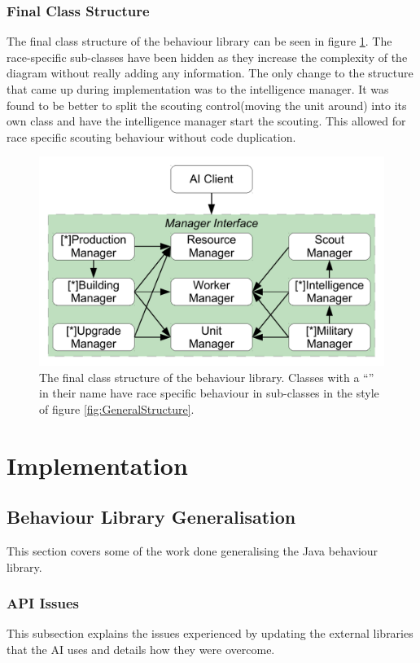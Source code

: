 \documentclass[11pt,openright,a4paper]{report}
\begin{document}
\subsection{Final Class Structure}
The final class structure of the behaviour library can be seen in figure \ref{fig:ClassDia}. The race-specific sub-classes have been hidden as they increase the complexity of the diagram without really adding any information. The only change to the structure that came up during implementation was to the intelligence manager. It was found to be better to split the scouting control(moving the unit around) into its own class and have the intelligence manager start the scouting. This allowed for race specific scouting behaviour without code duplication.
\begin{figure}[h]
    \centering
    \includegraphics[scale=0.5]{ClassDia}
    \caption{The final class structure of the behaviour library. Classes with a ``\lbrack*\rbrack'' in their name have race specific behaviour in sub-classes in the style of figure \ref{fig:GeneralStructure}.}
    \label{fig:ClassDia}
\end{figure}

\chapter{Implementation}
\label{Implementation}

\section{Behaviour Library Generalisation}
This section covers some of the work done generalising the Java behaviour library.
\subsection{API Issues}
\label{APIIssue}
This subsection explains the issues experienced by updating the external libraries that the AI uses and details how they were overcome.
\end{document}
